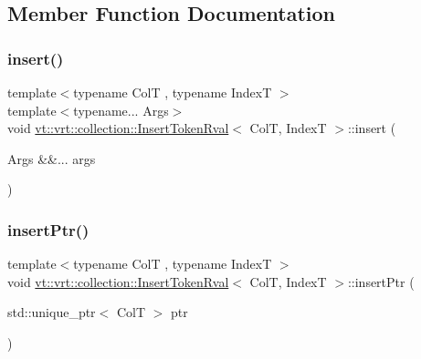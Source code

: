 \subsection{Member Function Documentation}
\mbox{\label{structvt_1_1vrt_1_1collection_1_1_insert_token_rval_a24233cafaa4d9a311c757573e3a61352}} 
\subsubsection{\texorpdfstring{insert()}{insert()}}
{\footnotesize\ttfamily template$<$typename ColT , typename IndexT $>$ \\
template$<$typename... Args$>$ \\
void \hyperlink{structvt_1_1vrt_1_1collection_1_1_insert_token_rval}{vt\+::vrt\+::collection\+::\+Insert\+Token\+Rval}$<$ ColT, IndexT $>$\+::insert (\begin{DoxyParamCaption}\item[{Args \&\&...}]{args }\end{DoxyParamCaption})}

\mbox{\label{structvt_1_1vrt_1_1collection_1_1_insert_token_rval_ad6201b0fcbd9b6647fb28c683f10571e}} 
\subsubsection{\texorpdfstring{insert\+Ptr()}{insertPtr()}}
{\footnotesize\ttfamily template$<$typename ColT , typename IndexT $>$ \\
void \hyperlink{structvt_1_1vrt_1_1collection_1_1_insert_token_rval}{vt\+::vrt\+::collection\+::\+Insert\+Token\+Rval}$<$ ColT, IndexT $>$\+::insert\+Ptr (\begin{DoxyParamCaption}\item[{std\+::unique\+\_\+ptr$<$ ColT $>$}]{ptr }\end{DoxyParamCaption})}



